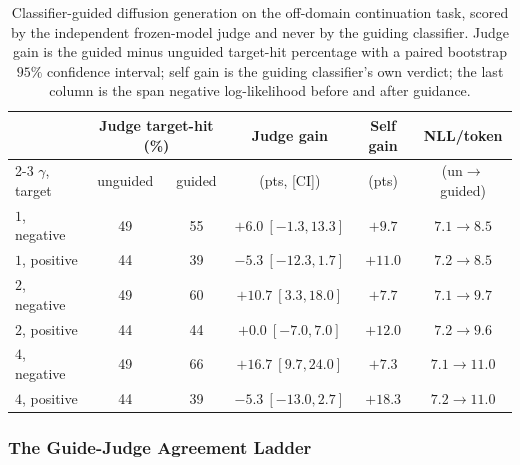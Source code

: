 \begin{table}[h]
    \centering
    \small
    \begin{tabular}{lccccc}
        \toprule
        & \multicolumn{2}{c}{Judge target-hit (\%)} & Judge gain & Self gain & NLL/token \\
        \cmidrule(lr){2-3}
        $\gamma$, target & unguided & guided & (pts, [CI]) & (pts) & (un$\to$guided) \\
        \midrule
        $1$, negative & 49 & 55 & $+6.0\ [-1.3,13.3]$ & $+9.7$ & $7.1\to8.5$ \\
        $1$, positive & 44 & 39 & $-5.3\ [-12.3,1.7]$ & $+11.0$ & $7.2\to8.5$ \\
        $2$, negative & 49 & 60 & $+10.7\ [3.3,18.0]$ & $+7.7$ & $7.1\to9.7$ \\
        $2$, positive & 44 & 44 & $+0.0\ [-7.0,7.0]$ & $+12.0$ & $7.2\to9.6$ \\
        $4$, negative & 49 & 66 & $+16.7\ [9.7,24.0]$ & $+7.3$ & $7.1\to11.0$ \\
        $4$, positive & 44 & 39 & $-5.3\ [-13.0,2.7]$ & $+18.3$ & $7.2\to11.0$ \\
        \bottomrule
    \end{tabular}
    \caption[Off-domain classifier-guided diffusion generation.]{Classifier-guided diffusion generation on the off-domain continuation task, scored by the independent frozen-model judge and never by the guiding classifier. Judge gain is the guided minus unguided target-hit percentage with a paired bootstrap $95\%$ confidence interval; self gain is the guiding classifier's own verdict; the last column is the span negative log-likelihood before and after guidance.}
    \label{tab:diffusion-guided}
\end{table}

\subsubsection{The Guide-Judge Agreement Ladder}
\label{app:guided-ladder}

